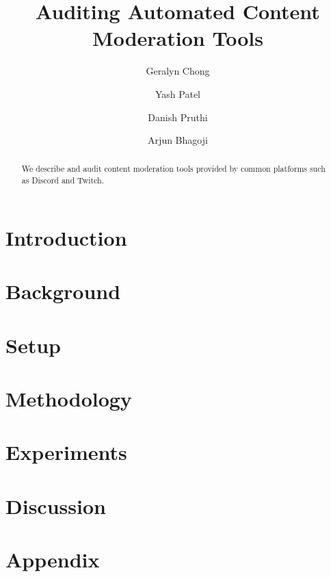 \documentclass{article}
\title{Auditing Automated Content Moderation Tools}
\author[1]{Geralyn Chong}
\author[2]{Yash Patel}
\author[2]{Danish Pruthi}
\author[1]{Arjun Bhagoji}
\affil[1]{University of Chicago}
\affil[2]{Indian Institute of Science}
\date{}
\begin{document}
\maketitle

\begin{abstract}
We describe and audit content moderation tools provided by common platforms such
as Discord and Twitch.
\end{abstract}




\section{Introduction}\label{sec: intro}


\section{Background}\label{sec: background}


\section{Setup}\label{sec:setup}


\section{Methodology}\label{sec: method}


\section{Experiments}\label{sec: results}


\section{Discussion}\label{sec: discussion}






\section{Appendix}\label{sec: Appendix}

\end{document}
